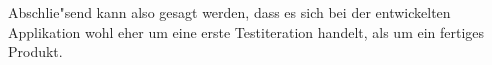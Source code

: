 \documentclass{article}
\begin{document}
Abschlie"send kann also gesagt werden, dass es sich bei der entwickelten Applikation wohl eher um eine erste Testiteration handelt, als um ein fertiges Produkt. 






%

\end{document}
